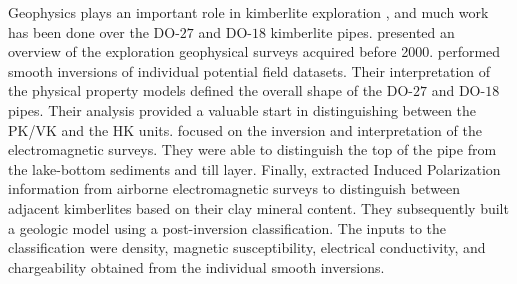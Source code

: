 \documentclass[paper, twocolumn]{geophysics} %
\begin{document}

Geophysics plays an important role in kimberlite exploration \citep{Macnae,Keating,Power}, and much work has been done over the DO-$27$ and DO-$18$ kimberlite pipes. \citet{JansenEtAl2004} presented an overview of the exploration geophysical surveys acquired before 2000. \citet{TKCpaper} performed smooth inversions of individual potential field datasets. Their interpretation of the physical property models defined the overall shape of the DO-$27$ and DO-$18$ pipes. Their analysis provided a valuable start in distinguishing between the PK/VK and the HK units. \citet{TKCEM} focused on the inversion and interpretation of the electromagnetic surveys. They were able to distinguish the top of the pipe from the lake-bottom sediments and till layer. Finally, \citet{TKCIP} extracted Induced Polarization information from airborne electromagnetic surveys to distinguish between adjacent kimberlites based on their clay mineral content. They subsequently built a geologic model using a post-inversion classification. The inputs to the classification were density, magnetic susceptibility, electrical conductivity, and chargeability obtained from the individual smooth inversions.
\end{document}
